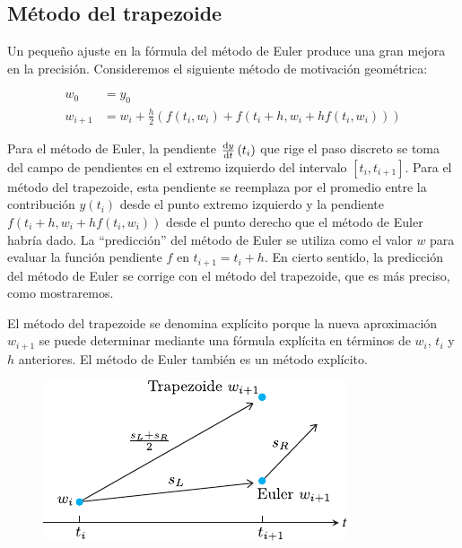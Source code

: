 \subsection{Método del trapezoide}

Un pequeño ajuste en la fórmula del método de Euler produce una gran
mejora en la precisión.
Consideremos el siguiente método de motivación geométrica:

\begin{align*}
    w_{0}   & =y_{0}  \\
    w_{i+1} & =w_{i}+
    \frac{h}{2}
    \left(
    f\left(t_{i},w_{i}\right)+
    f\left(t_{i}+h,w_{i}+hf\left(t_{i},w_{i}\right)\right)
    \right)
\end{align*}

Para el método de Euler, la pendiente $\diff{y}{t}\left(t_{i}\right)$
que rige el paso discreto se toma del campo de pendientes en el
extremo izquierdo del intervalo $\left[t_{i},t_{i+1}\right]$.
Para el método del trapezoide, esta pendiente se reemplaza por el
promedio entre la contribución $y\left(t_{i}\right)$ desde el punto
extremo izquierdo y la pendiente
\begin{math}
    f
    \left(
    t_{i}+h,
    w_{i}+hf\left(t_{i},w_{i}\right)
    \right)
\end{math}
desde el punto derecho que el método de Euler habría dado.
La ``predicción'' del método de Euler se utiliza como el valor $w$
para evaluar la función pendiente $f$ en $t_{i+1}=t_{i}+h$.
En cierto sentido, la predicción del método de Euler se corrige con
el método del trapezoide, que es más preciso, como mostraremos.

El método del trapezoide se denomina explícito porque la nueva aproximación
$w_{i+1}$ se puede determinar mediante una fórmula explícita en términos
de $w_{i}$, $t_{i}$ y $h$ anteriores.
El método de Euler también es un método explícito.

\begin{figure}[ht!]
    \centering
    \includegraphics[width=.3\paperwidth]{trapezoid}
\end{figure}

